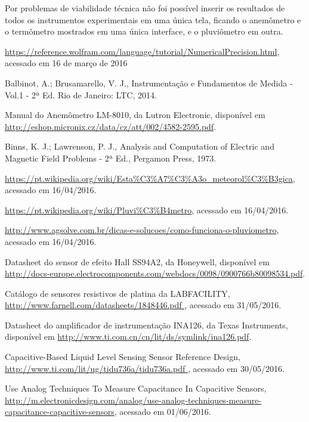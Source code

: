 \documentclass[a4paper]{instrumentacao}
\begin{document}
Por problemas de viabilidade técnica não foi possível inserir os resultados de todos os instrumentos experimentais em uma única tela, ficando o anemômetro e o termômetro mostrados em uma única interface, e o pluviômetro em outra.

\newpage
\begin{thebibliography}{9}
 \url{https://reference.wolfram.com/language/tutorial/NumericalPrecision.html}, acessado em 16 de março de 2016

  Balbinot, A.; Brusamarello, V. J., Instrumentação e Fundamentos de Medida - Vol.1 - 2ª Ed. Rio de Janeiro: LTC, 2014.

 Manual do Anemômetro LM-8010, da Lutron Electronic, disponível em \url{http://eshop.micronix.cz/data/cz/att/002/4582-2595.pdf}.

 Binns, K. J.; Lawrenson, P. J., Analysis and Computation of Electric and Magnetic Field Problems - 2ª Ed., Pergamon Press, 1973.

 \url{https://pt.wikipedia.org/wiki/Esta\%C3\%A7\%C3\%A3o_meteorol\%C3\%B3gica}, acessado em 16/04/2016.

 \url{https://pt.wikipedia.org/wiki/Pluvi\%C3\%B4metro}, acessado em 16/04/2016.

 \url{http://www.agsolve.com.br/dicas-e-solucoes/como-funciona-o-pluviometro}, acessado em 16/04/2016.

 Datasheet do sensor de efeito Hall SS94A2, da Honeywell, disponível em \url{http://docs-europe.electrocomponents.com/webdocs/0098/0900766b80098534.pdf}.

 Catálogo de sensores resistivos de platina da LABFACILITY, \url{http://www.farnell.com/datasheets/1848446.pdf }, acessado em 31/05/2016.

 Datasheet do amplificador de instrumentação INA126, da Texas Instruments, disponível em \url{http://www.ti.com.cn/cn/lit/ds/symlink/ina126.pdf}.

 Capacitive-Based Liquid Level Sensing Sensor Reference Design, \url{http://www.ti.com/lit/ug/tidu736a/tidu736a.pdf
}, acessado em 30/05/2016.

 Use Analog Techniques To Measure Capacitance In Capacitive Sensors, \url{http://m.electronicdesign.com/analog/use-analog-techniques-measure-capacitance-capacitive-sensors}, acessado em 01/06/2016.


\end{thebibliography}
\end{document}
